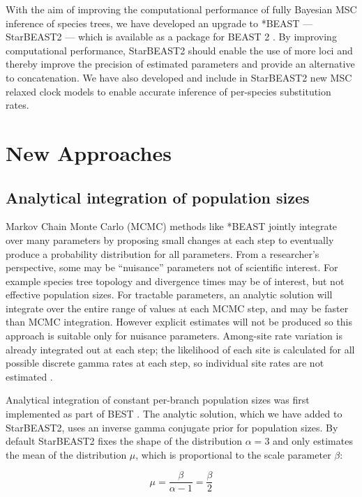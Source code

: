 \documentclass[12pt]{article}
\begin{document}
With the aim of improving the computational performance of fully Bayesian
MSC inference of species trees, we have developed an upgrade
to *BEAST --- StarBEAST2 --- which is available as a package for BEAST 2
\citep{10.1371/journal.pcbi.1003537}. By improving computational performance,
StarBEAST2 should enable the use of more loci and thereby improve the precision
of estimated parameters and provide an alternative to concatenation. We have
also developed and include in StarBEAST2 new MSC relaxed
clock models to enable accurate inference of per-species substitution rates.

\section{New Approaches}

\subsection{Analytical integration of population sizes}

Markov Chain Monte Carlo (MCMC) methods like *BEAST jointly integrate
over many parameters by proposing small changes at each step to eventually
produce a probability distribution for all parameters. From a
researcher's perspective, some may be ``nuisance'' parameters not of scientific
interest. For example species tree topology and divergence times may be of
interest, but not effective population sizes. For tractable parameters, an
analytic solution will integrate over the entire range of values at each MCMC
step, and may be faster than MCMC integration. However explicit
estimates will not be produced so this approach is suitable only for nuisance
parameters. Among-site rate variation is already integrated out at each step;
the likelihood of each site is calculated for all possible discrete gamma rates
at each step, so individual site rates are not estimated \citep{Yang1994}.

Analytical integration of constant per-branch population sizes was first
implemented as part of BEST \citep{EVO:EVO414}. The analytic solution, which we
have added to StarBEAST2, uses an inverse gamma conjugate prior for population
sizes. By default StarBEAST2 fixes the shape of the distribution $\alpha = 3$
and only estimates the mean of the distribution $\mu$, which is proportional to the
scale parameter $\beta$:

\begin{equation}
\mu = \frac{\beta}{\alpha - 1} = \frac{\beta}{2}
\end{equation}
\end{document}
